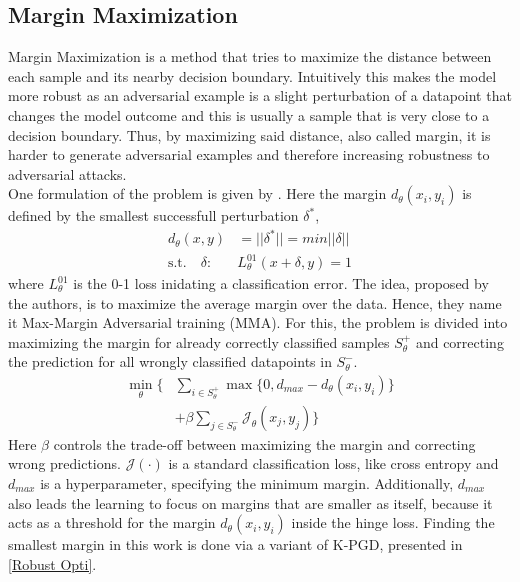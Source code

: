 \documentclass{article}
\begin{document}
\subsection{Margin Maximization}
Margin Maximization is a method that tries to maximize the distance between each sample and its nearby decision boundary. Intuitively this makes the model more robust as an adversarial example is a slight perturbation of a datapoint that changes the model outcome and this is usually a sample that is very close to a decision boundary. Thus, by maximizing said distance, also called margin, it is harder to generate adversarial examples and therefore increasing robustness to adversarial attacks. \\
One formulation of the problem is given by \cite{b1}. Here the margin $d_\theta(x_i, y_i)$ is defined by the smallest successfull perturbation $\delta^*$, 
\begingroup
\setlength\abovedisplayskip{0pt}
\setlength\belowdisplayskip{6pt}
\begin{align*}
  d_\theta(x,y) & = ||\delta^*|| = min ||\delta|| \\ 
  \text{s.t.} \quad \delta: & L_\theta^{01}(x+\delta, y) = 1
\end{align*}
\endgroup
where $L_\theta^{01}$ is the 0-1 loss inidating a classification error. The idea, proposed by the authors, is to maximize the average margin over the data. Hence, they name it Max-Margin Adversarial training (MMA). For this, the problem is divided into maximizing the margin for already correctly classified samples $S_{\theta}^{+}$ and correcting the prediction for all wrongly classified datapoints in $S_{\theta}^{-}$.
\begin{align*}
  \min_{\theta} \Big\{ & \sum_{i \in S_{\theta}^{+}} \max \{0, d_{max} - d_\theta(x_i, y_i)\} \\ 
  & + \beta \sum_{j \in S_{\theta}^{-}} \mathcal{J}_\theta (x_j, y_j) \Big\}
\end{align*}
Here $\beta$ controls the trade-off between maximizing the margin and correcting wrong predictions. $\mathcal{J}(\cdot)$ is a standard classification loss, like cross entropy and $d_{max}$ is a hyperparameter, specifying the minimum margin. Additionally, $d_{max}$ also leads the learning to focus on margins that are smaller as itself, because it acts as a threshold for the margin $d_\theta(x_i, y_i)$ inside the hinge loss. Finding the smallest margin in this work is done via a variant of K-PGD, presented in \ref{Robust Opti}.
  
\end{document}
